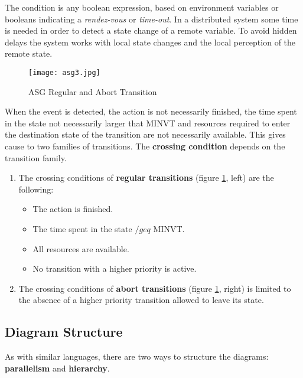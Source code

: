 \documentclass[../main.tex]{subfiles}
\begin{document}
The condition is any boolean expression, based on environment variables or booleans indicating a \textit{rendez-vous} or \textit{time-out}. In a distributed system some time is needed in order to detect a state change of a remote variable. To avoid hidden delays the system works with local state changes and the local perception of the remote state. 
\begin{figure}[H]
    \centering
    \texttt{[image: asg3.jpg]}
    \caption{ASG Regular and Abort Transition}
    \label{asg3}
\end{figure}
When the event is detected, the action is not necessarily finished, the time spent in the state not necessarily larger that MINVT and resources required to enter the destination state of the transition are not necessarily available. This gives cause to two families of transitions. The \textbf{crossing condition} depends on the transition family.
\begin{enumerate}
	\item  The crossing conditions of \textbf{regular transitions} (figure \ref{asg3}, left) are the following:
	\begin{itemize}
		\item The action is finished.
		\item The time spent in the state $/geq$ MINVT.
		\item All resources are available.
		\item No transition with a higher priority is active.
	\end{itemize}
	\item The crossing conditions of \textbf{abort transitions} (figure \ref{asg3}, right) is limited to the absence of a higher priority transition allowed to leave its state.
\end{enumerate}

\subsection{Diagram Structure}
As with similar languages, there are two ways to structure the diagrams: \textbf{parallelism} and \textbf{hierarchy}.
\end{document}

